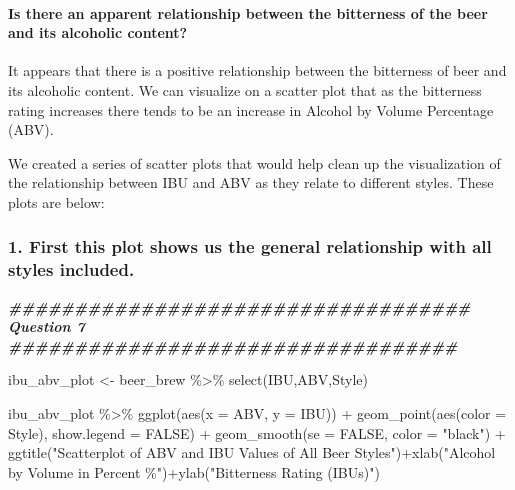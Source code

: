 \documentclass[
]{article}
\newenvironment{Shaded}{\begin{snugshade}}{\end{snugshade}}
\newcommand{\AttributeTok}[1]{\textcolor[rgb]{0.77,0.63,0.00}{#1}}
\newcommand{\ConstantTok}[1]{\textcolor[rgb]{0.00,0.00,0.00}{#1}}
\newcommand{\DocumentationTok}[1]{\textcolor[rgb]{0.56,0.35,0.01}{\textbf{\textit{#1}}}}
\newcommand{\FunctionTok}[1]{\textcolor[rgb]{0.00,0.00,0.00}{#1}}
\newcommand{\NormalTok}[1]{#1}
\newcommand{\OtherTok}[1]{\textcolor[rgb]{0.56,0.35,0.01}{#1}}
\newcommand{\SpecialCharTok}[1]{\textcolor[rgb]{0.00,0.00,0.00}{#1}}
\newcommand{\StringTok}[1]{\textcolor[rgb]{0.31,0.60,0.02}{#1}}
\begin{document}
\hypertarget{is-there-an-apparent-relationship-between-the-bitterness-of-the-beer-and-its-alcoholic-content}{%
\paragraph{Is there an apparent relationship between the bitterness of
the beer and its alcoholic
content?}\label{is-there-an-apparent-relationship-between-the-bitterness-of-the-beer-and-its-alcoholic-content}}

It appears that there is a positive relationship between the bitterness
of beer and its alcoholic content. We can visualize on a scatter plot
that as the bitterness rating increases there tends to be an increase in
Alcohol by Volume Percentage (ABV).

We created a series of scatter plots that would help clean up the
visualization of the relationship between IBU and ABV as they relate to
different styles. These plots are below:

\hypertarget{first-this-plot-shows-us-the-general-relationship-with-all-styles-included.}{%
\subsubsection{1. First this plot shows us the general relationship with
all styles
included.}\label{first-this-plot-shows-us-the-general-relationship-with-all-styles-included.}}

\begin{Shaded}
\begin{Highlighting}[]
\DocumentationTok{\#\#\#\#\#\#\#\#\#\#\#\#\#\#\#\#\#\#\#\#\#\#\#\#\#\#\#\#\#\#\#\#\#\#\# Question 7 \#\#\#\#\#\#\#\#\#\#\#\#\#\#\#\#\#\#\#\#\#\#\#\#\#\#\#\#\#\#\#\#\#\#}

\NormalTok{ibu\_abv\_plot }\OtherTok{\textless{}{-}}\NormalTok{ beer\_brew }\SpecialCharTok{\%\textgreater{}\%} \FunctionTok{select}\NormalTok{(IBU,ABV,Style)}
             
\NormalTok{ibu\_abv\_plot }\SpecialCharTok{\%\textgreater{}\%} \FunctionTok{ggplot}\NormalTok{(}\FunctionTok{aes}\NormalTok{(}\AttributeTok{x =}\NormalTok{ ABV, }\AttributeTok{y =}\NormalTok{ IBU)) }\SpecialCharTok{+} 
  \FunctionTok{geom\_point}\NormalTok{(}\FunctionTok{aes}\NormalTok{(}\AttributeTok{color =}\NormalTok{ Style), }\AttributeTok{show.legend =} \ConstantTok{FALSE}\NormalTok{) }\SpecialCharTok{+} 
  \FunctionTok{geom\_smooth}\NormalTok{(}\AttributeTok{se =} \ConstantTok{FALSE}\NormalTok{, }\AttributeTok{color =} \StringTok{"black"}\NormalTok{) }\SpecialCharTok{+}
  \FunctionTok{ggtitle}\NormalTok{(}\StringTok{"Scatterplot of ABV and IBU Values of All Beer Styles"}\NormalTok{)}\SpecialCharTok{+}\FunctionTok{xlab}\NormalTok{(}\StringTok{"Alcohol by Volume in Percent \%"}\NormalTok{)}\SpecialCharTok{+}\FunctionTok{ylab}\NormalTok{(}\StringTok{"Bitterness Rating (IBUs)"}\NormalTok{)}
\end{Highlighting}
\end{Shaded}
\end{document}
